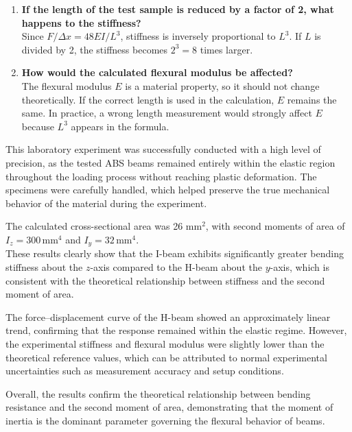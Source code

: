 \documentclass[12pt, a4paper]{article}
\begin{document}
\begin{enumerate}[label=\textbf{\arabic*.}, leftmargin=*]
\begin{figure}[H]
\end{figure}



    \item \textbf{If the length of the test sample is reduced by a factor of 2, what happens to the stiffness?} \\
    Since $F/\Delta x = 48EI/L^3$, stiffness is inversely proportional to $L^3$. If $L$ is divided by 2, the stiffness becomes $2^3 = 8$ times larger.

    \item \textbf{How would the calculated flexural modulus be affected?} \\
    The flexural modulus $E$ is a material property, so it should not change theoretically. If the correct length is used in the calculation, $E$ remains the same. In practice, a wrong length measurement would strongly affect $E$ because $L^3$ appears in the formula.
\end{enumerate}

\newpage

\nopagebreak
\vspace{0.3cm}

\noindent This laboratory experiment was successfully conducted with a high level of precision, as the tested ABS beams remained entirely within the elastic region throughout the loading process without reaching plastic deformation. The specimens were carefully handled, which helped preserve the true mechanical behavior of the material during the experiment.

The calculated cross-sectional area was 26 mm$^2$, with second moments of area of  \\  \(I_z = 300 \, \text{mm}^4\) and \(I_y = 32 \, \text{mm}^4\). \\These results clearly show that the I-beam exhibits significantly greater bending stiffness about the \(z\)-axis compared to the H-beam about the \(y\)-axis, which is consistent with the theoretical relationship between stiffness and the second moment of area.

The force--displacement curve of the H-beam showed an approximately linear trend, confirming that the response remained within the elastic regime. However, the experimental stiffness and flexural modulus were slightly lower than the theoretical reference values, which can be attributed to normal experimental uncertainties such as measurement accuracy and setup conditions.

Overall, the results confirm the theoretical relationship between bending resistance and the second moment of area, demonstrating that the moment of inertia is the dominant parameter governing the flexural behavior of beams.
\end{document}
